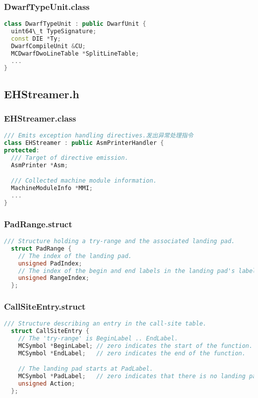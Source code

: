 \documentclass{ctexart}
\begin{document}
\subsubsection{DwarfTypeUnit.class}
\begin{lstlisting}[language=C++]
class DwarfTypeUnit : public DwarfUnit {
  uint64\_t TypeSignature;
  const DIE *Ty;
  DwarfCompileUnit &CU;
  MCDwarfDwoLineTable *SplitLineTable;
  ...
}
\end{lstlisting}



\subsection{EHStreamer.h}
\subsubsection{EHStreamer.class}
\begin{lstlisting}[language=C++]
/// Emits exception handling directives.发出异常处理指令
class EHStreamer : public AsmPrinterHandler {
protected:
  /// Target of directive emission.
  AsmPrinter *Asm;

  /// Collected machine module information.
  MachineModuleInfo *MMI;
  ...
}
\end{lstlisting}

\subsubsection{PadRange.struct}
\begin{lstlisting}[language=C++]
  /// Structure holding a try-range and the associated landing pad.
  struct PadRange {
    // The index of the landing pad.
    unsigned PadIndex;
    // The index of the begin and end labels in the landing pad's label lists.
    unsigned RangeIndex;
  };
\end{lstlisting}


\subsubsection{CallSiteEntry.struct}
\begin{lstlisting}[language=C++]
 /// Structure describing an entry in the call-site table.
  struct CallSiteEntry {
    // The 'try-range' is BeginLabel .. EndLabel.
    MCSymbol *BeginLabel; // zero indicates the start of the function.
    MCSymbol *EndLabel;   // zero indicates the end of the function.

    // The landing pad starts at PadLabel.
    MCSymbol *PadLabel;   // zero indicates that there is no landing pad.
    unsigned Action;
  };
\end{lstlisting}
\end{document}

